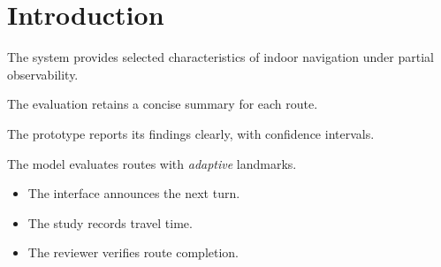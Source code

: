 \section{Introduction}

The system provides selected characteristics of indoor navigation under partial observability.

The evaluation retains a concise summary for each route.

The prototype reports its findings clearly, with confidence intervals.

The model evaluates routes with \emph{adaptive} landmarks.

\begin{itemize}
  \item The interface announces the next turn.
  \item The study records travel time.
  \item The reviewer verifies route completion.
\end{itemize}
